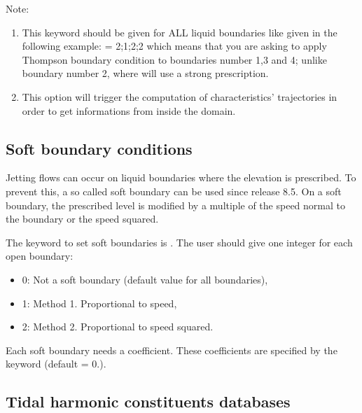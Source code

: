 \begin{WarningBlock}{Note:}
\begin{enumerate}
\item This keyword should be given for ALL liquid boundaries like given in the
following example: \newline
{}= 2;1;2;2 \newline
which means that you are asking  to apply Thompson boundary
condition to boundaries number 1,3 and 4;
unlike boundary number 2, where  will use a strong prescription.
\item This option will trigger the computation of characteristics' trajectories
in order to get informations from inside the domain.
\end{enumerate}
\end{WarningBlock}

\subsection{Soft boundary conditions}

Jetting flows can occur on liquid boundaries where the elevation is prescribed.
To prevent this, a so called soft boundary can be used since release 8.5.
On a soft boundary, the prescribed level is modified by a multiple of the speed
normal to the boundary or the speed squared. \newline

The keyword to set soft boundaries is . The user
should give one integer for each open boundary:

\begin{itemize}
\item 0: Not a soft boundary (default value for all boundaries),

\item 1: Method 1. Proportional to speed,

\item 2: Method 2. Proportional to speed squared.
\end{itemize}

Each soft boundary needs a coefficient.
These coefficients are specified by the keyword
 (default = 0.). \newline

\subsection{Tidal harmonic constituents databases}
\label{sec:tide}



